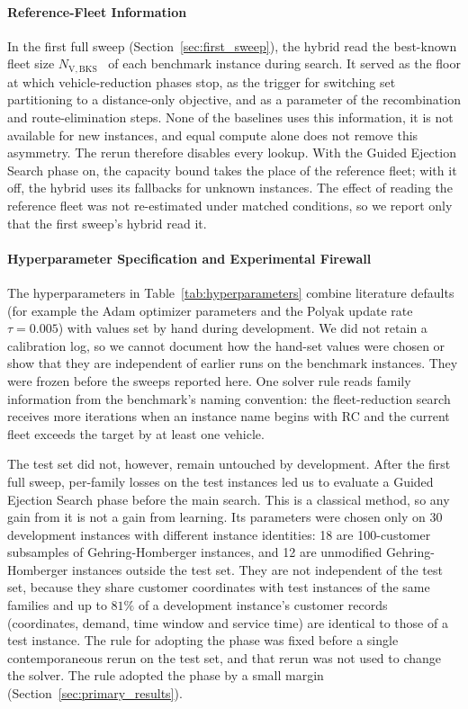 \documentclass{ieeeaccess}
\newcommand{\NVs}[1]{N_{\mathrm{V},\text{#1}}}
\begin{document}
\paragraph{Reference-Fleet Information}
In the first full sweep (Section~\ref{sec:first_sweep}), the hybrid read the best-known fleet size $\NVs{BKS}$~\cite{sintef_homberger} of each benchmark instance during search. It served as the floor at which vehicle-reduction phases stop, as the trigger for switching set partitioning to a distance-only objective, and as a parameter of the recombination and route-elimination steps. None of the baselines uses this information, it is not available for new instances, and equal compute alone does not remove this asymmetry. The rerun therefore disables every lookup. With the Guided Ejection Search phase on, the capacity bound takes the place of the reference fleet; with it off, the hybrid uses its fallbacks for unknown instances. The effect of reading the reference fleet was not re-estimated under matched conditions, so we report only that the first sweep's hybrid read it.

\paragraph{Hyperparameter Specification and Experimental Firewall}
The hyperparameters in Table~\ref{tab:hyperparameters} combine literature defaults (for example the Adam optimizer parameters and the Polyak update rate $\tau=0.005$) with values set by hand during development. We did not retain a calibration log, so we cannot document how the hand-set values were chosen or show that they are independent of earlier runs on the benchmark instances. They were frozen before the sweeps reported here. One solver rule reads family information from the benchmark's naming convention: the fleet-reduction search receives more iterations when an instance name begins with RC and the current fleet exceeds the target by at least one vehicle.

The test set did not, however, remain untouched by development. After the first full sweep, per-family losses on the test instances led us to evaluate a Guided Ejection Search phase before the main search. This is a classical method, so any gain from it is not a gain from learning. Its parameters were chosen only on 30 development instances with different instance identities: 18 are 100-customer subsamples of Gehring-Homberger instances, and 12 are unmodified Gehring-Homberger instances outside the test set. They are not independent of the test set, because they share customer coordinates with test instances of the same families and up to $81\%$ of a development instance's customer records (coordinates, demand, time window and service time) are identical to those of a test instance. The rule for adopting the phase was fixed before a single contemporaneous rerun on the test set, and that rerun was not used to change the solver. The rule adopted the phase by a small margin (Section~\ref{sec:primary_results}).
\end{document}
